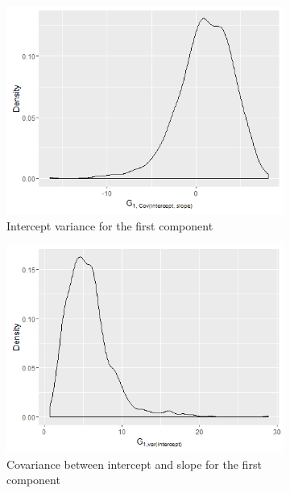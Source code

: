 \begin{figure}[!htb]
\centering
\begin{subfigure}[b]{0.4\textwidth}
		\includegraphics[width=\textwidth]{mainmatter/chapter_6_blood_donor/G11_1.png}
        \caption{\label{fig : cov_blood_donor_11_1} Intercept variance for the first component}
	\end{subfigure}
	\begin{subfigure}[b]{0.4\textwidth}
		\includegraphics[width=\textwidth]{mainmatter/chapter_6_blood_donor/G12_1.png}	
          \caption{\label{fig : cov_blood_donor_12_1} Covariance between intercept and slope for the first component}
	\end{subfigure}
	\begin{subfigure}[b]{0.4\textwidth}

\end{subfigure}
\end{figure}

